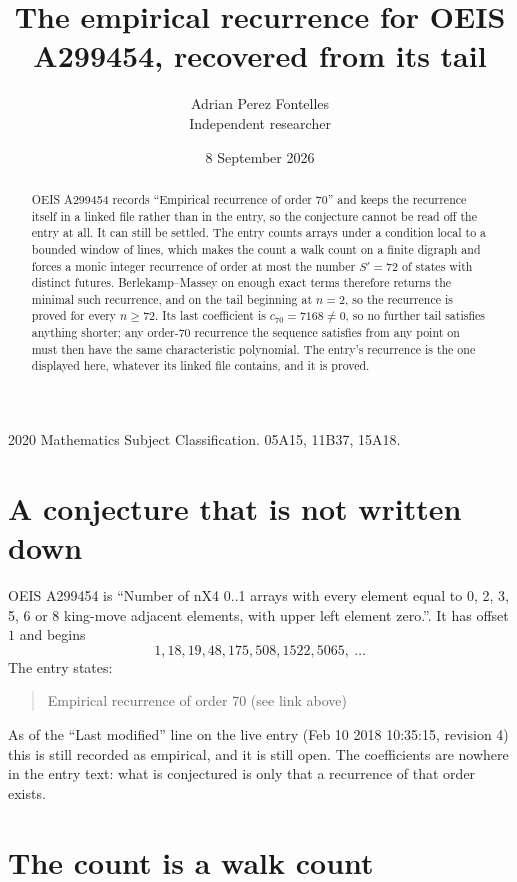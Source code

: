 \documentclass[11pt,a4paper]{article}
\title{The empirical recurrence for OEIS A299454, recovered from its tail}
\author{Adrian Perez Fontelles\\ \small Independent researcher}
\date{8 September 2026}
\theoremstyle{plain}
\theoremstyle{definition}
\begin{document}
\maketitle

\begin{abstract}
OEIS A299454 records ``Empirical recurrence of order $70$'' and keeps the recurrence itself in
a linked file rather than in the entry, so the conjecture cannot be read off the entry at all.
It can still be settled. The entry counts arrays under a condition local to a bounded window of
lines, which makes the count a walk count on a finite digraph and forces a monic integer
recurrence of order at most the number $S'=72$ of states with distinct futures. Berlekamp--Massey on
enough exact terms therefore returns the minimal such recurrence, and on the tail beginning at $n=2$, so the recurrence is proved for every $n\ge72$.
Its last coefficient is $c_{70}=7168\neq0$, so no further tail satisfies anything
shorter; any order-$70$ recurrence the sequence satisfies from any point on must then have
the same characteristic polynomial. The entry's recurrence is the one displayed here, whatever
its linked file contains, and it is proved.
\end{abstract}

\noindent\small 2020 Mathematics Subject Classification. 05A15, 11B37, 15A18.\normalsize

\section{A conjecture that is not written down}

OEIS A299454 is ``Number of nX4 0..1 arrays with every element equal to 0, 2, 3, 5, 6 or 8 king-move adjacent elements, with upper left element zero.''. It has offset $1$ and begins
\[
1, 18, 19, 48, 175, 508, 1522, 5065,\ \dots
\]
The entry states:
\begin{quote}
Empirical recurrence of order 70 (see link above)
\end{quote}
As of the ``Last modified'' line on the live entry (Feb 10 2018 10:35:15, revision 4)
this is still recorded as empirical, and it is still open. The coefficients are nowhere in the
entry text: what is conjectured is only that a recurrence of that order exists.

\section{The count is a walk count}
\end{document}
